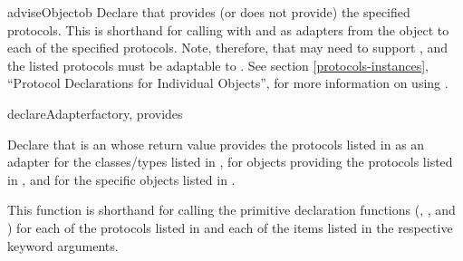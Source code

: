 \begin{verbatim%
}
\begin{verbatim%
}
\begin{verbatim%
}
\begin{verbatim%
}
\begin{funcdesc}{adviseObject}{ob
 }
Declare that  provides (or does not provide) the specified protocols.
This is shorthand for calling 
with  and  as adapters
from the object to each of the specified protocols.  Note, therefore, that
 may need to support , and the listed protocols
must be adaptable to .  See section
\ref{protocols-instances}, ``Protocol Declarations for Individual Objects'',
for more information on using .
\end{funcdesc}













\begin{funcdesc}{declareAdapter}{factory, provides
 
}

Declare that  is an  whose return value
provides the protocols listed in  as an adapter for the
classes/types listed in , for objects providing the protocols
listed in , and for the specific objects listed in
.

This function is shorthand for calling the primitive declaration
functions (,
, and )
for each of the protocols listed in  and each of the
items listed in the respective keyword arguments.
\end{funcdesc}


























\end{verbatim%
}
\end{verbatim%
}
\end{verbatim%
}
\end{verbatim%
}
